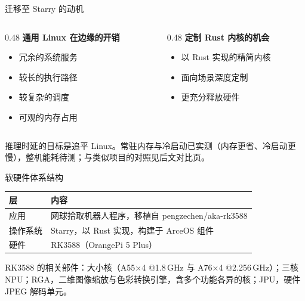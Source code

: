 \documentclass[aspectratio=169,fontset=mac]{ctexbeamer}
\newcommand{\hdr}[1]{\textsf{\bfseries\color{ink}#1}}
\newcommand{\headrow}{\rowcolor{tinthdr}}
\newcommand{\keyline}[1]{\par\vskip3pt\noindent\colorbox{tintbox}{\parbox{0.91\textwidth}{\color{ink}#1}}\par}
\begin{document}
\begin{frame}{迁移至 Starry 的动机}
\begin{columns}[T]
\begin{column}{0.48\textwidth}
\textbf{\color{ink}通用 Linux 在边缘的开销}
\begin{itemize}\small
\item 冗余的系统服务
\item 较长的执行路径
\item 较复杂的调度
\item 可观的内存占用
\end{itemize}
\end{column}
\begin{column}{0.48\textwidth}
\textbf{\color{ink}定制 Rust 内核的机会}
\begin{itemize}\small
\item 以 Rust 实现的精简内核
\item 面向场景深度定制
\item 更充分释放硬件
\end{itemize}
\end{column}
\end{columns}
\keyline{推理时延的目标是追平 Linux。常驻内存与冷启动已实测（内存更省、冷启动更慢），整机能耗待测；与类似项目的对照见后文对比页。}
\end{frame}

\begin{frame}{软硬件体系结构}
\small
\begin{tabular}{@{}p{}p{}@{}}
\toprule
\headrow \hdr{层} & \hdr{内容}\\
\midrule
应用 & 网球拾取机器人程序，移植自 pengzechen/aka-rk3588\\
操作系统 & Starry，以 Rust 实现，构建于 ArceOS 组件\\
硬件 & RK3588（OrangePi 5 Plus）\\
\bottomrule
\end{tabular}
\vskip6pt
RK3588 的相关部件：大小核（A55×4 @1.8\,GHz 与 A76×4 @2.256\,GHz）；三核 NPU；RGA，二维图像缩放与色彩转换引擎，含多个功能各异的核；JPU，硬件 JPEG 解码单元。
\end{frame}
\end{document}
